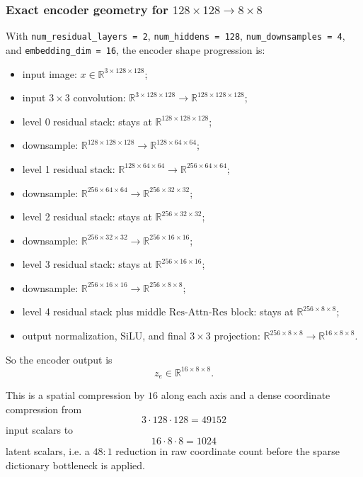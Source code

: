 \documentclass[11pt]{article}
\newcommand{\R}{\mathbb{R}}
\begin{document}
\subsubsection{Exact encoder geometry for $128 \times 128 \to 8 \times 8$}

With \texttt{num\_residual\_layers = 2}, \texttt{num\_hiddens = 128}, \texttt{num\_downsamples = 4}, and \texttt{embedding\_dim = 16}, the encoder shape progression is:
\begin{itemize}
  \item input image: $x \in \R^{3 \times 128 \times 128}$;
  \item input $3 \times 3$ convolution: $\R^{3 \times 128 \times 128} \to \R^{128 \times 128 \times 128}$;
  \item level 0 residual stack: stays at $\R^{128 \times 128 \times 128}$;
  \item downsample: $\R^{128 \times 128 \times 128} \to \R^{128 \times 64 \times 64}$;
  \item level 1 residual stack: $\R^{128 \times 64 \times 64} \to \R^{256 \times 64 \times 64}$;
  \item downsample: $\R^{256 \times 64 \times 64} \to \R^{256 \times 32 \times 32}$;
  \item level 2 residual stack: stays at $\R^{256 \times 32 \times 32}$;
  \item downsample: $\R^{256 \times 32 \times 32} \to \R^{256 \times 16 \times 16}$;
  \item level 3 residual stack: stays at $\R^{256 \times 16 \times 16}$;
  \item downsample: $\R^{256 \times 16 \times 16} \to \R^{256 \times 8 \times 8}$;
  \item level 4 residual stack plus middle $\mathrm{Res}$-$\mathrm{Attn}$-$\mathrm{Res}$ block: stays at $\R^{256 \times 8 \times 8}$;
  \item output normalization, SiLU, and final $3 \times 3$ projection: $\R^{256 \times 8 \times 8} \to \R^{16 \times 8 \times 8}$.
\end{itemize}

So the encoder output is
\[
z_e \in \R^{16 \times 8 \times 8}.
\]

This is a spatial compression by $16$ along each axis and a dense coordinate compression from
\[
3 \cdot 128 \cdot 128 = 49152
\]
input scalars to
\[
16 \cdot 8 \cdot 8 = 1024
\]
latent scalars, i.e. a $48:1$ reduction in raw coordinate count before the sparse dictionary bottleneck is applied.
\end{document}
